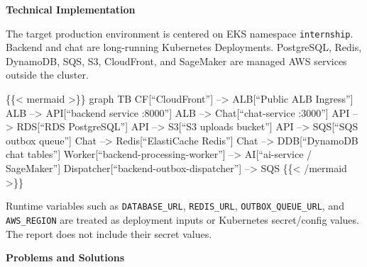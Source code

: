 \vspace{0.5em}\noindent\textbf{Technical Implementation}\par

The target production environment is centered on EKS namespace
\texttt{internship}. Backend and chat are long-running Kubernetes
Deployments. PostgreSQL, Redis, DynamoDB, SQS, S3, CloudFront, and
SageMaker are managed AWS services outside the cluster.

\{\{\textless{} mermaid \textgreater\}\} graph TB CF{[}``CloudFront''{]}
--\textgreater{} ALB{[}``Public ALB Ingress''{]} ALB --\textgreater{}
API{[}``backend service :8000''{]} ALB --\textgreater{}
Chat{[}``chat-service :3000''{]} API --\textgreater{} RDS{[}``RDS
PostgreSQL''{]} API --\textgreater{} S3{[}``S3 uploads bucket''{]} API
--\textgreater{} SQS{[}``SQS outbox queue''{]} Chat --\textgreater{}
Redis{[}``ElastiCache Redis''{]} Chat --\textgreater{} DDB{[}``DynamoDB
chat tables''{]} Worker{[}``backend-processing-worker''{]}
--\textgreater{} AI{[}``ai-service / SageMaker''{]}
Dispatcher{[}``backend-outbox-dispatcher''{]} --\textgreater{} SQS
\{\{\textless{} /mermaid \textgreater\}\}

Runtime variables such as \texttt{DATABASE\_\allowbreak{}URL}, \texttt{REDIS\_\allowbreak{}URL},
\texttt{OUTBOX\_\allowbreak{}QUEUE\_\allowbreak{}URL}, and \texttt{AWS\_\allowbreak{}REGION} are treated as
deployment inputs or Kubernetes secret/config values. The report does
not include their secret values.

\vspace{0.5em}\noindent\textbf{Problems and Solutions}\par


